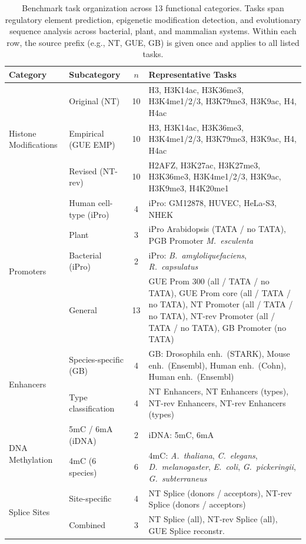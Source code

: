 \documentclass{article}
\theoremstyle{plain}
\theoremstyle{definition}
\theoremstyle{remark}
\begin{document}
\begin{table}[h]
\centering
\caption{Benchmark task organization across 13 functional categories. 
Tasks span regulatory element prediction, epigenetic modification 
detection, and evolutionary sequence analysis across bacterial, 
plant, and mammalian systems. Within each row, the source prefix 
(e.g., NT, GUE, GB) is given once and applies to all listed tasks.}
\label{tab:task_groups}
\small
\begin{tabular}{@{}llcp{9.5cm}@{}}
\toprule
\textbf{Category} & \textbf{Subcategory} & \textbf{$n$} & \textbf{Representative Tasks} \\
\midrule
\multirow{3}{*}{Histone Modifications} & Original (NT) & 10 & H3, H3K14ac, H3K36me3, H3K4me1/2/3, H3K79me3, H3K9ac, H4, H4ac \\
& Empirical (GUE EMP) & 10 & H3, H3K14ac, H3K36me3, H3K4me1/2/3, H3K79me3, H3K9ac, H4, H4ac \\
& Revised (NT-rev) & 10 & H2AFZ, H3K27ac, H3K27me3, H3K36me3, H3K4me1/2/3, H3K9ac, H3K9me3, H4K20me1 \\
\midrule
\multirow{4}{*}{Promoters} & Human cell-type (iPro) & 4 & iPro: GM12878, HUVEC, HeLa-S3, NHEK \\
 & Plant & 3 & iPro Arabidopsis (TATA / no TATA), PGB Promoter \emph{M.\ esculenta} \\
 & Bacterial (iPro) & 2 & iPro: \emph{B.\ amyloliquefaciens}, \emph{R.\ capsulatus} \\
 & General & 13 & GUE Prom 300 (all / TATA / no TATA), GUE Prom core (all / TATA / no TATA), NT Promoter (all / TATA / no TATA), NT-rev Promoter (all / TATA / no TATA), GB Promoter (no TATA) \\
\midrule
\multirow{2}{*}{Enhancers} & Species-specific (GB) & 4 & GB: Drosophila enh.\ (STARK), Mouse enh.\ (Ensembl), Human enh.\ (Cohn), Human enh.\ (Ensembl) \\
 & Type classification & 4 & NT Enhancers, NT Enhancers (types), NT-rev Enhancers, NT-rev Enhancers (types) \\
\midrule
\multirow{2}{*}{DNA Methylation} & 5mC / 6mA (iDNA) & 2 & iDNA: 5mC, 6mA \\
 & 4mC (6 species) & 6 & 4mC: \emph{A.\ thaliana}, \emph{C.\ elegans}, \emph{D.\ melanogaster}, \emph{E.\ coli}, \emph{G.\ pickeringii}, \emph{G.\ subterraneus} \\
\midrule
\multirow{2}{*}{Splice Sites} & Site-specific & 4 & NT Splice (donors / acceptors), NT-rev Splice (donors / acceptors) \\
 & Combined & 3 & NT Splice (all), NT-rev Splice (all), GUE Splice reconstr. \\

\end{tabular}
\end{table}
\end{document}
